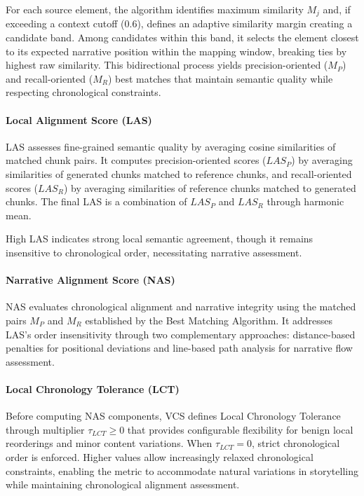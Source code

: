 \documentclass[letterpaper]{article} %
\begin{document}
For each source element, the algorithm identifies maximum similarity $M_j$ and, if exceeding a context cutoff (0.6), defines an adaptive similarity margin creating a candidate band. Among candidates within this band, it selects the element closest to its expected narrative position within the mapping window, breaking ties by highest raw similarity. This bidirectional process yields precision-oriented ($M_P$) and recall-oriented ($M_R$) best matches that maintain semantic quality while respecting chronological constraints.

\paragraph{Local Alignment Score (LAS)}
LAS assesses fine-grained semantic quality by averaging cosine similarities of matched chunk pairs. It computes precision-oriented scores ($LAS_P$) by averaging similarities of generated chunks matched to reference chunks, and recall-oriented scores ($LAS_R$) by averaging similarities of reference chunks matched to generated chunks. The final LAS is a combination of $LAS_P$ and $LAS_R$ through harmonic mean.

High LAS indicates strong local semantic agreement, though it remains insensitive to chronological order, necessitating narrative assessment.

\paragraph{Narrative Alignment Score (NAS)}
NAS evaluates chronological alignment and narrative integrity using the matched pairs $M_P$ and $M_R$ established by the Best Matching Algorithm. It addresses LAS's order insensitivity through two complementary approaches: distance-based penalties for positional deviations and line-based path analysis for narrative flow assessment.

\paragraph{Local Chronology Tolerance (LCT)}
Before computing NAS components, VCS defines Local Chronology Tolerance through multiplier $\tau_{LCT} \geq 0$ that provides configurable flexibility for benign local reorderings and minor content variations. When $\tau_{LCT}=0$, strict chronological order is enforced. Higher values allow increasingly relaxed chronological constraints, enabling the metric to accommodate natural variations in storytelling while maintaining chronological alignment assessment.
\end{document}
